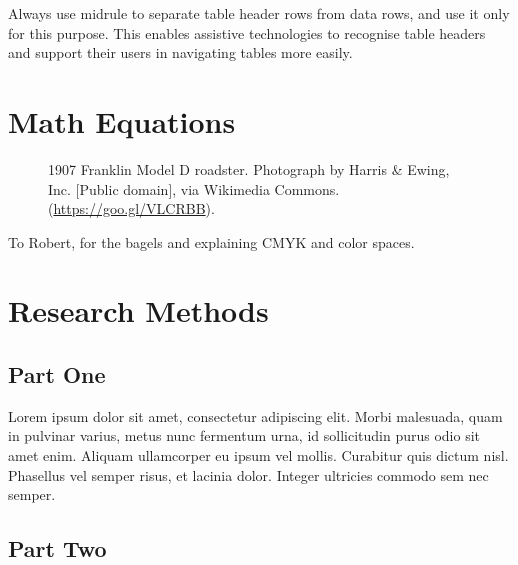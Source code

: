 \documentclass[sigconf]{acmart}
\begin{document}
Always use midrule to separate table header rows from data rows, and
use it only for this purpose. This enables assistive technologies to
recognise table headers and support their users in navigating tables
more easily.

\section{Math Equations}

\begin{figure}[h]
    \centering
    \caption{1907 Franklin Model D roadster. Photograph by Harris \&
    Ewing, Inc. [Public domain], via Wikimedia
    Commons. (\url{https://goo.gl/VLCRBB}).}
\end{figure}

\begin{acks}
To Robert, for the bagels and explaining CMYK and color spaces.
\end{acks}

%
%

\appendix

\section{Research Methods}

\subsection{Part One}

Lorem ipsum dolor sit amet, consectetur adipiscing elit. Morbi
malesuada, quam in pulvinar varius, metus nunc fermentum urna, id
sollicitudin purus odio sit amet enim. Aliquam ullamcorper eu ipsum
vel mollis. Curabitur quis dictum nisl. Phasellus vel semper risus, et
lacinia dolor. Integer ultricies commodo sem nec semper.

\subsection{Part Two}
\end{document}
